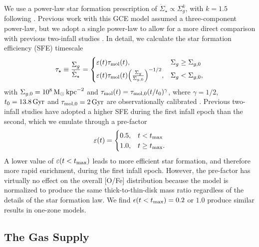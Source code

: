 \documentclass[twocolumn,twocolappendix]{aastex701}
\newcommand{\kpc}{\,{\rm kpc}}
\begin{document}
We use a power-law star formation prescription of $\dot\Sigma_\star\propto\Sigma_g^k$, with $k=1.5$ following \citet{kennicutt_global_1998}. Previous work with this GCE model \citep[e.g.,][]{johnson_stellar_2021,dubay_galactic_2024} assumed a three-component power-law, but we adopt a single power-law to allow for a more direct comparison with previous two-infall studies \citep[e.g.,][]{spitoni_remind_2024}. In detail, we calculate the star formation efficiency (SFE) timescale
\begin{equation}
    \label{eq:sf-law}
    \tau_\star \equiv \frac{\Sigma_g}{\dot\Sigma_\star} = 
    \begin{cases}
        \varepsilon(t) \tau_{\rm mol}(t),   & \Sigma_g \ge \Sigma_{g,0} \\
        \varepsilon(t) \tau_{\rm mol}(t) \Big(\frac{\Sigma_g}{\Sigma_{g,0}}\Big)^{-1/2}, & \Sigma_g < \Sigma_{g,0},
    \end{cases}
\end{equation}
with $\Sigma_{g,0} = 10^8\,{\rm M}_\odot\kpc^{-2}$ and $\tau_{\rm mol}(t)=\tau_{\rm mol,0}(t/t_0)^\gamma$, where $\gamma=1/2$, $t_0=13.8\,{\rm Gyr}$ and $\tau_{\rm mol,0}=2\,{\rm Gyr}$ are observationally calibrated \citep{leroy_star_2008}. Previous two-infall studies \citep[e.g.,][]{spitoni_galactic_2019,spitoni_galactic_2020,palla_chemical_2020} have adopted a higher SFE during the first infall epoch than the second, which we emulate through a pre-factor
\begin{equation}
    \label{eq:sfe-prefactor}
    \varepsilon(t) = 
    \begin{cases}
        0.5, & t < t_{\rm max} \\
        1.0, & t \ge t_{\rm max}.
    \end{cases}
\end{equation}
A lower value of $\varepsilon(t<t_{\rm max})$ leads to more efficient star formation, and therefore more rapid enrichment, during the first infall epoch. However, the pre-factor has virtually no effect on the overall [O/Fe] distribution because the model is normalized to produce the same thick-to-thin-disk mass ratio regardless of the details of the star formation law. We find $\epsilon(t<t_{\rm max})=0.2$ or $1.0$ produce similar results in one-zone models.

\subsection{The Gas Supply}
\label{sec:sfh}
\end{document}
